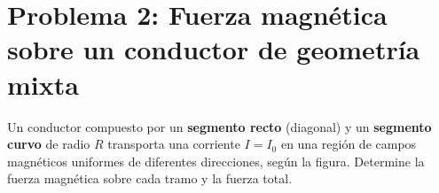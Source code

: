 \documentclass[12pt,letterpaper]{article}
\begin{document}
\newpage

\section*{Problema 2: Fuerza magn\'etica sobre un conductor de geometr\'ia mixta}

\noindent Un conductor compuesto por un \textbf{segmento recto} (diagonal) y un
\textbf{segmento curvo} de radio $R$ transporta una corriente $I = I_0$ en una regi\'on de
campos magn\'eticos uniformes de diferentes direcciones, seg\'un la figura. Determine la
fuerza magn\'etica sobre cada tramo y la fuerza total.

\medskip
\end{document}
